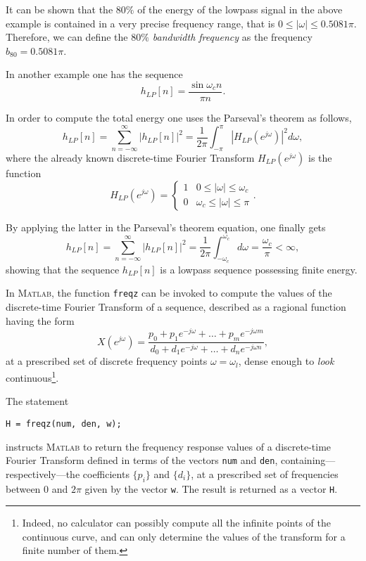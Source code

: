 \documentclass[\documentfontsize, twocolumn]{\classname}
\begin{document}
It can be shown that the $80\%$ of the energy of the lowpass signal in the above example is contained in a very precise frequency range, that is $0 \leq |\omega| \leq 0.5081\pi$. Therefore, we can define the \emph{$80\%$ bandwidth frequency} as the frequency $b_{80} = 0.5081\pi$.

In another example one has the sequence
\[
    h_{LP}[n] = \frac {\sin {\omega_c n}}{\pi n}.
\]

In order to compute the total energy one uses the Parseval's theorem as follows,
\[
h_{LP}[n] = \sum_{n=-\infty}^\infty \left|h_{LP}[n]\right|^2 = \frac 1 {2\pi} \int_{-\pi}^\pi \left|H_{LP}(e^{j\omega})\right|^2d\omega,
\]
where the already known discrete-time Fourier Transform $H_{LP}(e^{j\omega})$ is the function
\[
    H_{LP}(e^{j\omega}) = \left\{\begin{array}{ll}
        1 & 0 \leq |\omega| \leq \omega_c\\
        0 & \omega_c \leq |\omega| \leq \pi
        \end{array}\right..
\]

By applying the latter in the Parseval's theorem equation, one finally gets
\[
h_{LP}[n] = \sum_{n=-\infty}^\infty \left|h_{LP}[n]\right|^2 = \frac 1 {2\pi} \int_{-\omega_c}^{\omega_c} d\omega = \frac {\omega_c} \pi < \infty,
\]
showing that the sequence $h_{LP}[n]$ is a lowpass sequence possessing finite energy.


In \textsc{Matlab}, the function \texttt{freqz} can be invoked to compute the values of the discrete-time Fourier Transform of a sequence, described as a ragional function having the form
\begin{equation}\label{eqn:dtftRationalForm}
    X(e^{j\omega}) = \frac
    {p_0 + p_1e^{-j\omega} + \dots + p_m e^{-j\omega m}}
    {d_0 + d_1e^{-j\omega} + \dots + d_n e^{-j\omega n}},
\end{equation}
at a prescribed set of discrete frequency points $\omega = \omega_l$, dense enough to \emph{look} continuous\footnote{Indeed, no calculator can possibly compute all the infinite points of the continuous curve, and can only determine the values of the transform for a finite number of them.}.

The statement
\begin{verbatim}
H = freqz(num, den, w);
\end{verbatim}
instructs \textsc{Matlab} to return the frequency response values of a discrete-time Fourier Transform defined in terms of the vectors \texttt{num} and \texttt{den}, con\-tain\-ing---res\-pec\-ti\-ve\-ly---the coefficients $\{p_i\}$ and $\{d_i\}$, at a prescribed set of frequencies between $0$ and $2\pi$ given by the vector \texttt{w}. The result is returned as a vector \texttt{H}.
\end{document}
